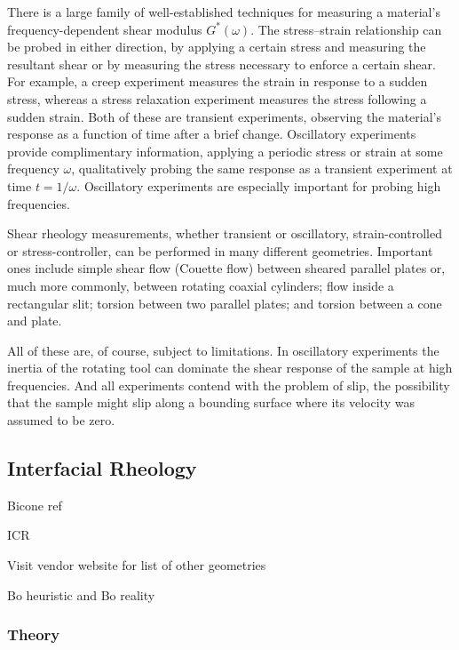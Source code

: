 There is a large family of well-established techniques for measuring a material's frequency-dependent shear modulus $G^*(\omega)$. The stress--strain relationship can be probed in either direction, by applying a certain stress and measuring the resultant shear or by measuring the stress necessary to enforce a certain shear. For example, a creep experiment measures the strain in response to a sudden stress, whereas a stress relaxation experiment measures the stress following a sudden strain. Both of these are transient experiments, observing the material's response as a function of time after a brief change. Oscillatory experiments provide complimentary information, applying a periodic stress or strain at some frequency $\omega$, qualitatively probing the same response as a transient experiment at time $t=1/\omega$. Oscillatory experiments are especially important for probing high frequencies.

Shear rheology measurements, whether transient or oscillatory, strain-controlled or stress-controller, can be performed in many different geometries. Important ones include simple shear flow (Couette flow) between sheared parallel plates or, much more commonly, between rotating coaxial cylinders; flow inside a rectangular slit; torsion between two parallel plates; and torsion between a cone and plate.

All of these are, of course, subject to limitations. In oscillatory experiments the inertia of the rotating tool can dominate the shear response of the sample at  high frequencies. And all experiments contend with the problem of slip, the possibility that the sample might slip along a bounding surface where its velocity was assumed to be zero.

\subsection{Interfacial Rheology}




Bicone ref

ICR

Visit vendor website for list of other geometries

Bo heuristic and Bo reality
\subsubsection{Theory}
